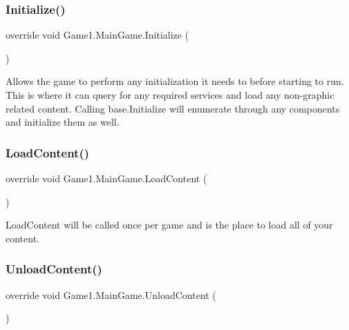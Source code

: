 \subsubsection{\texorpdfstring{Initialize()}{Initialize()}}
{\footnotesize\ttfamily override void Game1.\+Main\+Game.\+Initialize (\begin{DoxyParamCaption}{ }\end{DoxyParamCaption})\hspace{0.3cm}{\ttfamily [protected]}}



Allows the game to perform any initialization it needs to before starting to run. This is where it can query for any required services and load any non-\/graphic related content. Calling base.\+Initialize will enumerate through any components and initialize them as well. 

\mbox{\label{class_game1_1_1_main_game_af72c3af428f8a64fe92e252035d80c2c}} 
\subsubsection{\texorpdfstring{LoadContent()}{LoadContent()}}
{\footnotesize\ttfamily override void Game1.\+Main\+Game.\+Load\+Content (\begin{DoxyParamCaption}{ }\end{DoxyParamCaption})\hspace{0.3cm}{\ttfamily [protected]}}



Load\+Content will be called once per game and is the place to load all of your content. 

\mbox{\label{class_game1_1_1_main_game_a936ae13590f54579e8ca8fc4cfca105a}} 
\subsubsection{\texorpdfstring{UnloadContent()}{UnloadContent()}}
{\footnotesize\ttfamily override void Game1.\+Main\+Game.\+Unload\+Content (\begin{DoxyParamCaption}{ }\end{DoxyParamCaption})\hspace{0.3cm}{\ttfamily [protected]}}



